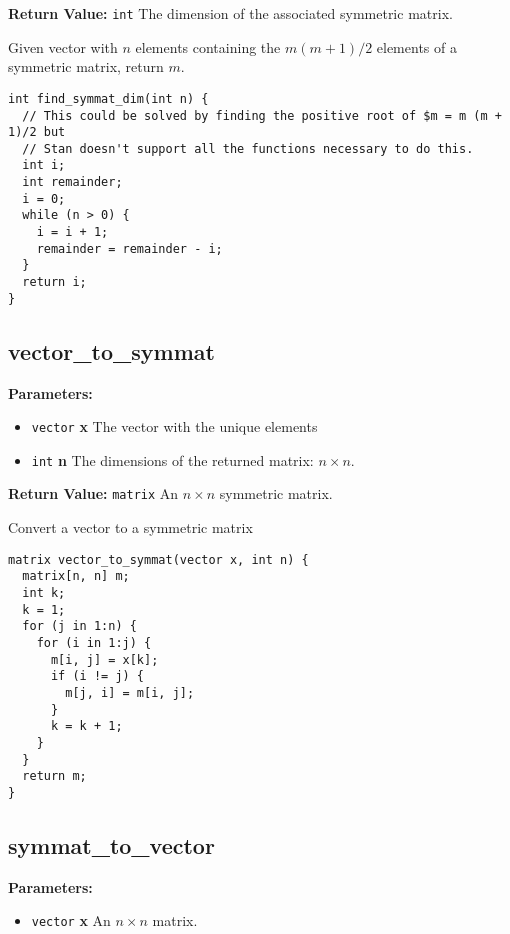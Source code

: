 \documentclass[]{book}
\providecommand{\tightlist}{%
  \setlength{\itemsep}{0pt}\setlength{\parskip}{0pt}}
\begin{document}
\textbf{Return Value:} \texttt{int} The dimension of the associated
symmetric matrix.

Given vector with \(n\) elements containing the \(m (m + 1) / 2\)
elements of a symmetric matrix, return \(m\).

\begin{verbatim}
int find_symmat_dim(int n) {
  // This could be solved by finding the positive root of $m = m (m + 1)/2 but
  // Stan doesn't support all the functions necessary to do this.
  int i;
  int remainder;
  i = 0;
  while (n > 0) {
    i = i + 1;
    remainder = remainder - i;
  }
  return i;
}
\end{verbatim}

\subsection{vector\_to\_symmat}\label{vectorux5ftoux5fsymmat}

\textbf{Parameters:}

\begin{itemize}
\tightlist
\item
  \texttt{vector} \textbf{x} The vector with the unique elements
\item
  \texttt{int} \textbf{n} The dimensions of the returned matrix:
  \(n \times n\).
\end{itemize}

\textbf{Return Value:} \texttt{matrix} An \(n \times n\) symmetric
matrix.

Convert a vector to a symmetric matrix

\begin{verbatim}
matrix vector_to_symmat(vector x, int n) {
  matrix[n, n] m;
  int k;
  k = 1;
  for (j in 1:n) {
    for (i in 1:j) {
      m[i, j] = x[k];
      if (i != j) {
        m[j, i] = m[i, j];
      }
      k = k + 1;
    }
  }
  return m;
}
\end{verbatim}

\subsection{symmat\_to\_vector}\label{symmatux5ftoux5fvector}

\textbf{Parameters:}

\begin{itemize}
\tightlist
\item
  \texttt{vector} \textbf{x} An \(n \times n\) matrix.
\end{itemize}
\end{document}
